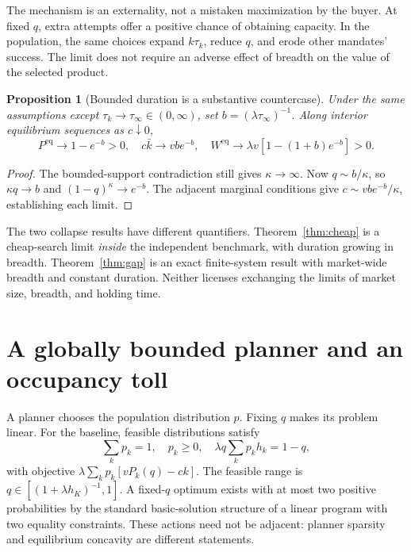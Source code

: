 \documentclass[11pt,a4paper]{article}
\newtheorem{proposition}[theorem]{Proposition}
\begin{document}
The mechanism is an externality, not a mistaken maximization by the buyer. At fixed $q$, extra attempts offer a positive chance of obtaining capacity. In the population, the same choices expand $k\tau_k$, reduce $q$, and erode other mandates' success. The limit does not require an adverse effect of breadth on the value of the selected product.

\begin{proposition}[Bounded duration is a substantive countercase]\label{prop:constant}
Under the same assumptions except $\tau_k\to\tau_\infty\in(0,\infty)$, set $b=(\lambda\tau_\infty)^{-1}$. Along interior equilibrium sequences as $c\downarrow0$,
\[
 P^{\mathrm{eq}}\to1-e^{-b}>0,\quad
 c\bar k\to vb e^{-b},\quad
 W^{\mathrm{eq}}\to\lambda v[1-(1+b)e^{-b}]>0.
\]
\end{proposition}
\begin{proof}
The bounded-support contradiction still gives $\kappa\to\infty$. Now $q\sim b/\kappa$, so $\kappa q\to b$ and $(1-q)^\kappa\to e^{-b}$. The adjacent marginal conditions give $c\sim vb e^{-b}/\kappa$, establishing each limit.
\end{proof}

The two collapse results have different quantifiers. Theorem~\ref{thm:cheap} is a cheap-search limit \emph{inside} the independent benchmark, with duration growing in breadth. Theorem~\ref{thm:gap} is an exact finite-system result with market-wide breadth and constant duration. Neither licenses exchanging the limits of market size, breadth, and holding time.

\section{A globally bounded planner and an occupancy toll}\label{sec:planner}
A planner chooses the population distribution $p$. Fixing $q$ makes its problem linear. For the baseline, feasible distributions satisfy
\begin{equation}
 \sum_kp_k=1,\quad p_k\geq0,\quad
 \lambda q\sum_kp_kh_k=1-q,\label{eq:lp}
\end{equation}
with objective $\lambda\sum_kp_k[vP_k(q)-ck]$. The feasible range is $q\in[(1+\lambda h_K)^{-1},1]$. A fixed-$q$ optimum exists with at most two positive probabilities by the standard basic-solution structure of a linear program with two equality constraints. These actions need not be adjacent: planner sparsity and equilibrium concavity are different statements.
\end{document}
